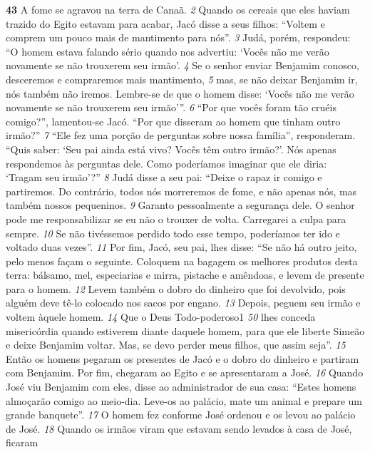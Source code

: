 \textbf{\large 43}
 A fome se agravou na terra de Canaã. 
\textit{\tiny 2} 
Quando os cereais que eles haviam
trazido do Egito estavam para acabar, Jacó disse a seus filhos: “Voltem e comprem
um pouco mais de mantimento para nós”. 
\textit{\tiny 3}
Judá, porém, respondeu: “O homem estava falando sério quando nos advertiu:
‘Vocês não me verão novamente se não trouxerem seu irmão’. 
\textit{\tiny 4} 
Se o senhor enviar
Benjamim conosco, desceremos e compraremos mais mantimento, 
\textit{\tiny 5} 
mas, se não
deixar Benjamim ir, nós também não iremos. Lembre-se de que o homem disse:
‘Vocês não me verão novamente se não trouxerem seu irmão’”. 
\textit{\tiny 6}
“Por que vocês foram tão cruéis comigo?”, lamentou-se Jacó.
 “Por que
disseram ao homem que tinham outro irmão?” 
\textit{\tiny 7}
“Ele fez uma porção de perguntas sobre nossa família”, responderam. “Quis
saber: ‘Seu pai ainda está vivo? Vocês têm outro irmão?’. Nós apenas respondemos
às perguntas dele. Como poderíamos imaginar que ele diria: ‘Tragam seu irmão’?” 
\textit{\tiny 8}
Judá disse a seu pai: “Deixe o rapaz ir comigo e partiremos. Do contrário,
todos nós morreremos de fome, e não apenas nós, mas também nossos
pequeninos. 
\textit{\tiny 9} 
Garanto pessoalmente a segurança dele. O senhor pode me
responsabilizar se eu não o trouxer de volta. Carregarei a culpa para sempre. 
\textit{\tiny 10}
Se
não tivéssemos perdido todo esse tempo, poderíamos ter ido e voltado duas
vezes”.
\textit{\tiny 11}
Por  fim, Jacó, seu pai, lhes disse: “Se não há outro jeito, pelo menos façam o
seguinte. Coloquem na bagagem os melhores produtos desta terra: bálsamo, mel,
especiarias e mirra, pistache e amêndoas, e levem de presente para o homem.
\textit{\tiny 12}
Levem também o dobro do dinheiro que foi devolvido, pois alguém deve tê-lo
colocado nos sacos por engano. 
\textit{\tiny 13}
Depois, peguem seu irmão e voltem àquele
homem. 
\textit{\tiny 14}
Que o Deus Todo-poderoso1
\textit{\tiny 50}
 lhes conceda misericórdia quando
estiverem diante daquele homem, para que ele liberte Simeão e deixe Benjamim
voltar. Mas, se devo perder meus filhos, que assim seja”.
\textit{\tiny 15}
Então os homens pegaram os presentes de Jacó e o dobro do dinheiro e
partiram com Benjamim. Por fim, chegaram ao Egito e se apresentaram a José.
\textit{\tiny 16}
Quando José viu Benjamim com eles, disse ao administrador de sua casa: “Estes
homens almoçarão comigo ao meio-dia. Leve-os ao palácio, mate um animal e
prepare um grande banquete”. 
\textit{\tiny 17}
O homem fez conforme José ordenou e os levou
ao palácio de José.
\textit{\tiny 18}
Quando os irmãos viram que estavam sendo levados à casa de José, ficaram
